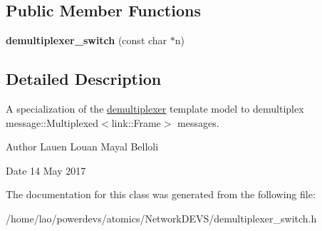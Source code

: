 \subsection*{Public Member Functions}
\begin{DoxyCompactItemize}
\item 
{\bfseries demultiplexer\+\_\+switch} (const char $\ast$n)\hypertarget{classdemultiplexer__switch_a7e1728adcdcb9628a53c66e2c2e8ad3d}{}\label{classdemultiplexer__switch_a7e1728adcdcb9628a53c66e2c2e8ad3d}

\end{DoxyCompactItemize}


\subsection{Detailed Description}
A specialization of the \hyperlink{classdemultiplexer}{demultiplexer} template model to demultiplex message\+::\+Multiplexed$<$link\+::\+Frame$>$ messages. 

\begin{DoxyAuthor}{Author}
Lauen Louan Mayal Belloli 
\end{DoxyAuthor}
\begin{DoxyDate}{Date}
14 May 2017 
\end{DoxyDate}


The documentation for this class was generated from the following file\+:\begin{DoxyCompactItemize}
\item 
/home/lao/powerdevs/atomics/\+Network\+D\+E\+V\+S/demultiplexer\+\_\+switch.\+h\end{DoxyCompactItemize}
